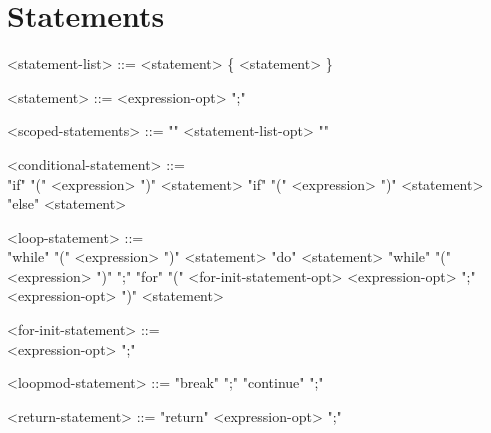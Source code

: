 \documentclass[11pt,letterpaper]{book}
\begin{document}
\section*{Statements}
\begin{grammar}

<statement-list> ::= <statement> \{ <statement> \}

<statement> ::= 
<expression-opt> ";"

<scoped-statements> ::= "{" <statement-list-opt> "}"

<conditional-statement> ::= \spc \\ "if" "(" <expression> ")" <statement>
\alt "if" "(" <expression> ")" <statement> "else" <statement>

<loop-statement> ::= \spc \\ "while" "(" <expression> ")" <statement>
\alt "do" <statement> "while" "(" <expression> ")" ";"
\alt "for" "(" <for-init-statement-opt>  <expression-opt> ";" <expression-opt> ")" <statement>

<for-init-statement> ::= \spc \\ <expression-opt> ";"

<loopmod-statement> ::= "break" ";"
\alt "continue" ";"


<return-statement> ::= "return" <expression-opt> ";"

\end{grammar}
\end{document}

